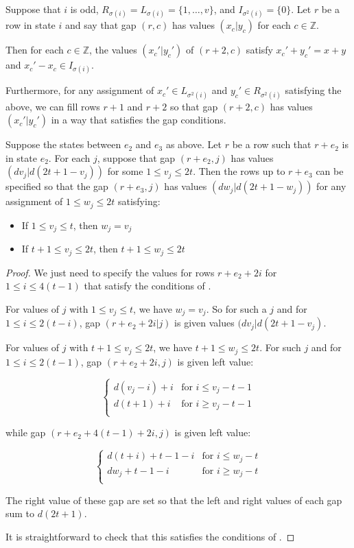 \documentclass[10pt,a4paper]{amsart}
\begin{document}
\begin{lemma}\label{lem:verticalonlyconstraint}
Suppose that $i$ is odd, $R_{\sigma(i)}=L_{\sigma(i)}=\{1, \dots, v\}$, and $I_{\sigma^2(i)}=\{0\}$. Let $r$ be a row in state $i$ and say that gap $(r, c)$ has values $(x_c|y_c)$ for each $c\in \mathbb{Z}$.

Then for each $c\in \mathbb{Z}$, the values $(x_c'|y_c')$ of $(r+2, c)$ satisfy $x_c'+y_c'=x+y$ and $x_c'-x_c\in I_{\sigma(i)}$. 

Furthermore, for any assignment of $x_{c}'\in L_{\sigma^2(i)}$ and $y_{c}'\in R_{\sigma^2(i)}$ satisfying the above, we can fill rows $r+1$ and $r+2$ so that gap $(r+2, c)$ has values $(x_c'|y_c')$ in a way that satisfies the gap conditions.
\end{lemma}

\begin{lemma}\label{lem:verticalspecification}
Suppose the states between $e_2$ and $e_3$ as above. Let $r$ be a row such that $r+e_2$ is in state $e_2$.
For each $j$, suppose that gap $(r+e_2, j)$ has values $(dv_j|d(2t+1-v_j))$ for some $1\le v_j \le 2t$. Then the rows up to $r+e_3$ can be specified so that the gap $(r+e_3, j)$ has values $(dw_j|d(2t+1-w_j))$ for any assignment of $1\le w_j \le 2t$ satisfying:

\begin{itemize}
    \item If $1\le v_j\le t$, then $w_j=v_j$
    \item If $t+1\le v_j \le 2t$, then $t+1\le w_j\le 2t$
\end{itemize}
\end{lemma}

\begin{proof}
We just need to specify the values for rows $r+e_2+2i$ for $1\le i \le 4(t-1)$ that satisfy the conditions of . 

For values of $j$ with $1\le v_j \le t$, we have $w_j=v_j$. So for such a $j$ and for $1\le i\le 2(t-i)$, gap $(r+e_2+2i|j)$ is given values $(dv_j|d(2t+1-v_j)$.

For values of $j$ with $t+1\le v_j\le 2t$, we have $t+1\le w_j\le 2t$. For such $j$ and for $1\le i \le 2(t-1)$, gap $(r+e_2+2i, j)$ is given left value:

\[
\begin{cases}
d(v_j-i)+i&\text{for }i\le v_j-t-1\\
d(t+1)+i&\text{for }i\ge v_j-t-1\\
\end{cases}
\]

\noindent while gap $(r+e_2+4(t-1)+2i, j)$ is given left value:

\[
\begin{cases}
d(t+i)+t-1-i&\text{for }i\le w_j-t\\
dw_j+t-1-i&\text{for }i\ge w_j-t\\
\end{cases}
\]

\noindent The right value of these gap are set so that the left and right values of each gap sum to $d(2t+1)$. 

It is straightforward to check that this satisfies the conditions of .
\end{proof}
\end{document}
